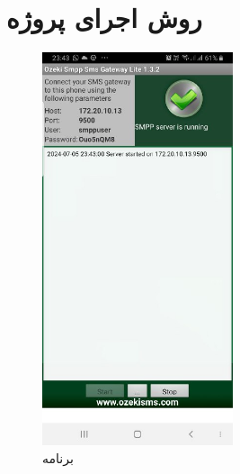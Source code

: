 \documentclass{report}
\begin{document}
\section{روش اجرای پروژه}
\begin{figure}[b]
	\centering
	\includegraphics[width=0.5\textwidth]{Pic/ozeki}
	\caption{برنامه 
	}
	\label{fig:ozeki}
\end{figure}
\end{document}
